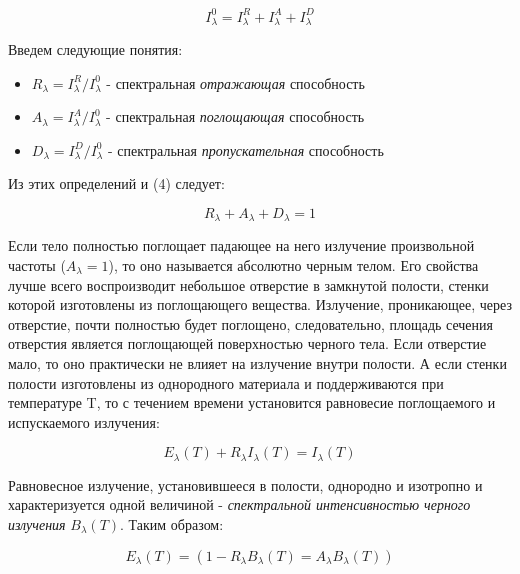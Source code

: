 \documentclass[12pt,a4paper]{article}
\begin{document}
\begin{equation}
I_{\lambda}^0 = I_{\lambda}^R + I_{\lambda}^A + I_{\lambda}^D
\end{equation}

\par Введем следующие понятия:
\begin{itemize}
\item $R_{\lambda} = I_{\lambda}^R/I_{\lambda}^0$ - спектральная \textit{отражающая} способность
\item $A_{\lambda} = I_{\lambda}^A/I_{\lambda}^0$ - спектральная \textit{поглощающая} способность
\item $D_{\lambda} = I_{\lambda}^D/I_{\lambda}^0$ - спектральная \textit{пропускательная} способность
\end{itemize}

\par Из этих определений и (4) следует:

\begin{equation}
R_{\lambda} + A_{\lambda} + D_{\lambda} = 1
\end{equation}

\par Если тело полностью поглощает падающее на него излучение произвольной частоты ($A_{\lambda} = 1$), то оно называется абсолютно черным телом. Его свойства лучше всего воспроизводит небольшое отверстие в замкнутой полости, стенки которой изготовлены из поглощающего вещества. Излучение, проникающее, через отверстие, почти полностью будет поглощено, следовательно, площадь сечения отверстия является поглощающей поверхностью черного тела. Если отверстие мало, то оно практически не влияет на излучение внутри полости. А если стенки полости изготовлены из однородного материала и поддерживаются при температуре T, то с течением времени установится равновесие поглощаемого и испускаемого излучения:

\begin{equation}
E_{\lambda}(T) + R_{\lambda}I_{\lambda}(T) = I_{\lambda}(T)
\end{equation}

\par Равновесное излучение, установившееся в полости, однородно и изотропно и характеризуется одной величиной - \textit{спектральной интенсивностью черного излучения} $B_{\lambda}(T)$. Таким образом: 

\begin{equation}
E_{\lambda}(T) = (1 - R_{\lambda}B_{\lambda}(T) = A_{\lambda}B_{\lambda}(T))
\end{equation}
\end{document}
